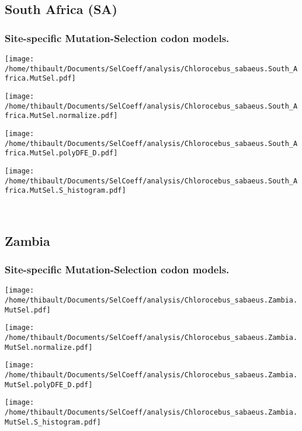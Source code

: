 \subsection{South Africa (SA)} 
 
\subsubsection*{Site-specific Mutation-Selection codon models.} 
\begin{minipage}{0.49\linewidth} 
\texttt{[image: /home/thibault/Documents/SelCoeff/analysis/Chlorocebus\_sabaeus.South\_Africa.MutSel.pdf]} 
\end{minipage}
\begin{minipage}{0.49\linewidth} 
\texttt{[image: /home/thibault/Documents/SelCoeff/analysis/Chlorocebus\_sabaeus.South\_Africa.MutSel.normalize.pdf]} 
\end{minipage}
\begin{minipage}{0.49\linewidth} 
\texttt{[image: /home/thibault/Documents/SelCoeff/analysis/Chlorocebus\_sabaeus.South\_Africa.MutSel.polyDFE\_D.pdf]} 
\end{minipage}
\begin{minipage}{0.49\linewidth} 
\texttt{[image: /home/thibault/Documents/SelCoeff/analysis/Chlorocebus\_sabaeus.South\_Africa.MutSel.S\_histogram.pdf]} 
\end{minipage}
\\ 
\subsection{Zambia} 
 
\subsubsection*{Site-specific Mutation-Selection codon models.} 
\begin{minipage}{0.49\linewidth} 
\texttt{[image: /home/thibault/Documents/SelCoeff/analysis/Chlorocebus\_sabaeus.Zambia.MutSel.pdf]} 
\end{minipage}
\begin{minipage}{0.49\linewidth} 
\texttt{[image: /home/thibault/Documents/SelCoeff/analysis/Chlorocebus\_sabaeus.Zambia.MutSel.normalize.pdf]} 
\end{minipage}
\begin{minipage}{0.49\linewidth} 
\texttt{[image: /home/thibault/Documents/SelCoeff/analysis/Chlorocebus\_sabaeus.Zambia.MutSel.polyDFE\_D.pdf]} 
\end{minipage}
\begin{minipage}{0.49\linewidth} 
\texttt{[image: /home/thibault/Documents/SelCoeff/analysis/Chlorocebus\_sabaeus.Zambia.MutSel.S\_histogram.pdf]} 
\end{minipage}
\\ 
